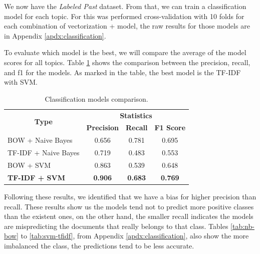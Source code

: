 
We now have the \textit{Labeled Past} dataset. From that, we can train a classification model for each topic. For this was performed cross-validation with 10 folds for each combination of vectorization + model, the raw results for those models are in Appendix \ref{apdx:classification}.


To evaluate which model is the best, we will compare the average of the model scores for all topics. Table \ref{tab:classification-report} shows the comparison between the precision, recall, and f1 for the models.
As marked in the table, the best model is the TF-IDF with SVM.

\begin{table}[h!]
	\centering
	\caption{Classification models comparison.}
	\label{tab:classification-report}
	\begin{tabular}{c|ccc}
		\toprule
		\multirow{2}{*}{\textbf{Type}} & \multicolumn{3}{c}{\textbf{Statistics}} \\\cmidrule{2-4}
		 & \textbf{Precision} & \textbf{Recall} & \textbf{F1 Score} \\ \midrule
		\multicolumn{1}{l|}{BOW + Naive Bayes}     & 0.656 & 0.781 & 0.695 \\
		\multicolumn{1}{l|}{TF-IDF + Naive Bayes}  & 0.719 & 0.483 & 0.553 \\
		\multicolumn{1}{l|}{BOW + SVM}             & 0.863 & 0.539 & 0.648 \\
		\multicolumn{1}{l|}{\textbf{TF-IDF + SVM}} & \textbf{0.906} & \textbf{0.683} & \textbf{0.769} \\
		\bottomrule
	\end{tabular}
\end{table}

Following these results, we identified that we have a bias for higher precision than recall. These results show us the models tend not to predict more positive classes than the existent ones, on the other hand, the smaller recall indicates the models are mispredicting the documents that really belongs to that class. Tables \ref{tab:nb-bow} to \ref{tab:svm-tfidf}, from Appendix \ref{apdx:classification}, also show the more imbalanced the class, the predictions tend to be less accurate.


